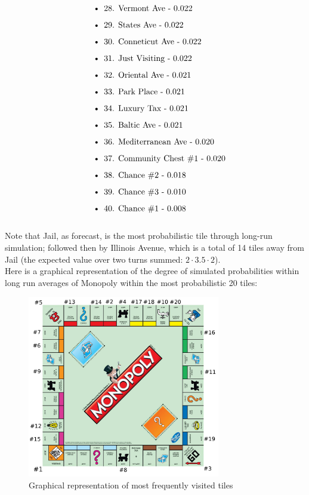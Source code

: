 \documentclass[12pt]{article}
\begin{document}
\begin{align*}
\begin{minipage}{0.5\textwidth}
\begin{flushleft}
\begin{itemize}
  \item {28. Vermont Ave - 0.022}
  \item {29. States Ave - 0.022}
  \item {30. Conneticut Ave - 0.022}
  \item {31. Just Visiting - 0.022}
  \item {32. Oriental Ave - 0.021}
  \item {33. Park Place - 0.021}
  \item {34. Luxury Tax - 0.021}
  \item {35. Baltic Ave - 0.021}
  \item {36. Mediterranean Ave - 0.020}
  \item {37. Community Chest \#1 - 0.020}
  \item {38. Chance \#2 - 0.018}
  \item {39. Chance \#3 - 0.010}
  \item {40. Chance \#1 - 0.008}
\end{itemize}
\end{flushleft}
\end{minipage}
\end{align*}\\
Note that Jail, as forecast, is the most probabilistic tile through long-run simulation; followed then by Illinois Avenue, which is a total of 14 tiles away from Jail (the expected value over two turns summed: $2\cdot3.5\cdot2$).
\\
Here is a graphical representation of the degree of simulated probabilities within long run averages of Monopoly within the most probabilistic 20 tiles:
\\
\begin{figure}[h]
\centering
\includegraphics[width=0.75\textwidth]{tile_outcome.jpg}
\caption{Graphical representation of most frequently visited tiles}
\end{figure}
\end{document}
